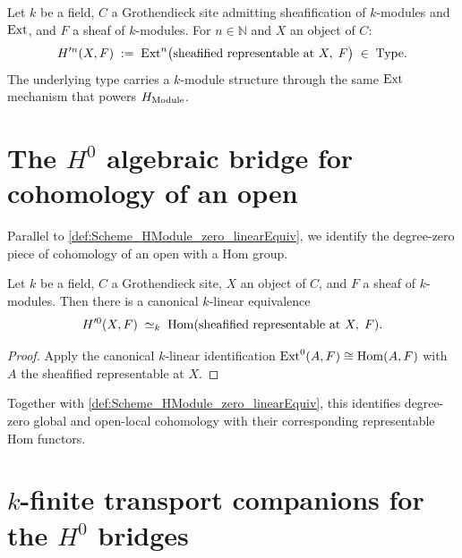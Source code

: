 \begin{definition}\leanok
  \label{def:Scheme_HModule_prime}

  Let \(k\) be a field, \(C\) a Grothendieck site admitting sheafification of \(k\)-modules and \(\operatorname{Ext}\), and \(F\) a sheaf of \(k\)-modules. For \(n \in \mathbb N\) and \(X\) an object of \(C\):
  \[
    H^{\prime n}(X, F) \;:=\; \operatorname{Ext}^n\bigl(\text{sheafified representable at }X,\; F\bigr) \;\in\; \mathrm{Type}.
  \]
  The underlying type carries a \(k\)-module structure through the same \(\operatorname{Ext}\) mechanism that powers \(H_{\mathrm{Module}}\).
\end{definition}

\section{The \(H^0\) algebraic bridge for cohomology of an open}
\label{sec:hmodule_prime_zero}

Parallel to \cref{def:Scheme_HModule_zero_linearEquiv}, we identify the degree-zero piece of cohomology of an open with a Hom group.

\begin{definition}\leanok
  \label{def:Scheme_HModule_prime_zero_linearEquiv}

  Let \(k\) be a field, \(C\) a Grothendieck site, \(X\) an object of \(C\), and \(F\) a sheaf of \(k\)-modules. Then there is a canonical \(k\)-linear equivalence
  \[
    H^{\prime 0}(X, F) \;\simeq_k\; \operatorname{Hom}(\text{sheafified representable at }X,\; F).
  \]
\end{definition}

\begin{proof}
  
  \leanok
  Apply the canonical \(k\)-linear identification \(\operatorname{Ext}^0(A,F) \cong \operatorname{Hom}(A,F)\) with \(A\) the sheafified representable at \(X\).
\end{proof}

Together with \cref{def:Scheme_HModule_zero_linearEquiv}, this identifies degree-zero global and open-local cohomology with their corresponding representable Hom functors.

\section{\(k\)-finite transport companions for the \(H^0\) bridges}
\label{sec:HModule_finite_zero_iter038}

